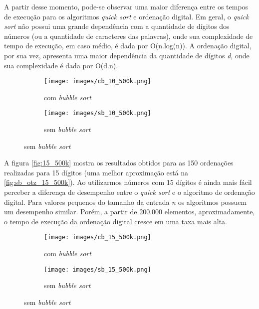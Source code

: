 \documentclass[12pt]{article}
\begin{document}
A partir desse momento, pode-se observar uma maior diferença entre os tempos de execução para os algoritmos \textit{quick sort} e ordenação digital. Em geral, o \textit{quick sort} não possui uma grande dependência com a quantidade de dígitos dos números (ou a quantidade de caracteres das palavras), onde sua complexidade de tempo de execução, em caso médio, é dada por O(n.log(n)). A ordenação digital, por sua vez, apresenta uma maior dependência da quantidade de dígitos \textit{d}, onde sua complexidade é dada por O(d.n).

\begin{figure}[]
	\centering
	\caption{Três testes para 10 dígitos}
	\begin{subfigure}[H]{0.8\textwidth}
		\centering
		\texttt{[image: images/cb\_10\_500k.png]}
		\caption{com \textit{bubble sort}}
		\label{fig:cb_10_500k}
	\end{subfigure}
	\hfill
	\begin{subfigure}[H]{0.8\textwidth}
		\centering
		\texttt{[image: images/sb\_10\_500k.png]}
		\caption{sem \textit{bubble sort}}
		\label{fig:sb_10_500k}
	\end{subfigure}
	\label{fig:10_500k}
\end{figure}



A figura \autoref{fig:15_500k} mostra os resultados obtidos para as 150 ordenações realizadas para 15 dígitos (uma melhor aproximação está na \autoref{fig:sb_otz_15_500k}). Ao utilizarmos números com 15 dígitos é ainda mais fácil perceber a diferença de desempenho entre o \textit{quick sort} e o algoritmo de ordenação digital. Para valores pequenos do tamanho da entrada \textit{n} os algoritmos possuem um desempenho similar. Porém, a partir de 200.000 elementos, aproximadamente, o tempo de execução da ordenação digital cresce em uma taxa mais alta.

\begin{figure}[]
	\centering
	\caption{Três testes para 15 dígitos}
	\begin{subfigure}[H]{0.8\textwidth}
		\centering
		\texttt{[image: images/cb\_15\_500k.png]}
		\caption{com \textit{bubble sort}}
		\label{fig:cb_15_500k}
	\end{subfigure}
	\hfill
	\begin{subfigure}[H]{0.8\textwidth}
		\centering
		\texttt{[image: images/sb\_15\_500k.png]}
		\caption{sem \textit{bubble sort}}
		\label{fig:sb_15_500k}
	\end{subfigure}
	\label{fig:15_500k}
\end{figure}
\end{document}
